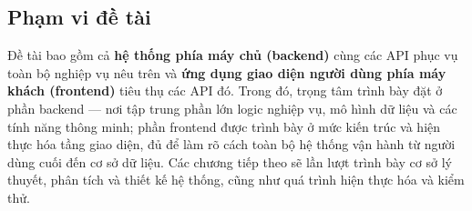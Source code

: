 \subsection{Phạm vi đề tài}

Đề tài bao gồm cả \textbf{hệ thống phía máy chủ (backend)} cùng các API
phục vụ toàn bộ nghiệp vụ nêu trên và \textbf{ứng dụng giao diện người dùng
phía máy khách (frontend)} tiêu thụ các API đó. Trong đó, trọng tâm trình
bày đặt ở phần backend --- nơi tập trung phần lớn logic nghiệp vụ, mô hình
dữ liệu và các tính năng thông minh; phần frontend được trình bày ở mức kiến
trúc và hiện thực hóa tầng giao diện, đủ để làm rõ cách toàn bộ hệ thống vận
hành từ người dùng cuối đến cơ sở dữ liệu. Các chương tiếp theo sẽ lần lượt
trình bày cơ sở lý thuyết, phân tích và thiết kế hệ thống, cũng như quá
trình hiện thực hóa và kiểm thử.
